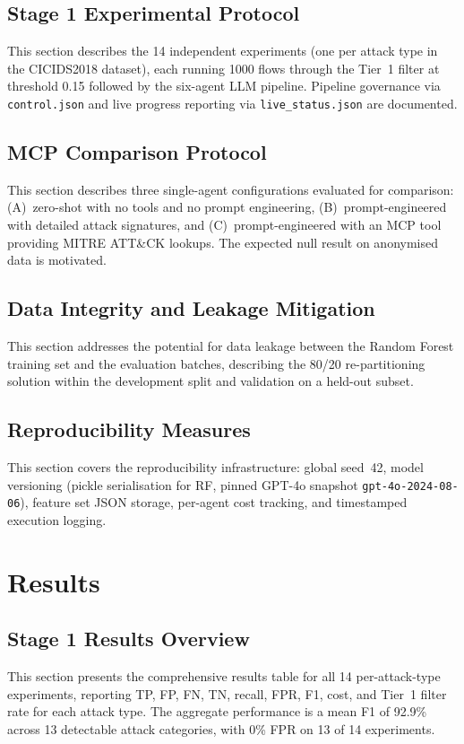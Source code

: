 \documentclass[12pt,openany,oneside,a4paper]{book}
\begin{document}
\section{Stage 1 Experimental Protocol}
\label{sec:stage1-protocol}
This section describes the 14 independent experiments (one per attack type in the CICIDS2018 dataset), each running 1000 flows through the Tier~1 filter at threshold 0.15 followed by the six-agent LLM pipeline. Pipeline governance via \texttt{control.json} and live progress reporting via \texttt{live\_status.json} are documented.

\section{MCP Comparison Protocol}
\label{sec:mcp-comparison-protocol}
This section describes three single-agent configurations evaluated for comparison: (A)~zero-shot with no tools and no prompt engineering, (B)~prompt-engineered with detailed attack signatures, and (C)~prompt-engineered with an MCP tool providing MITRE ATT\&CK lookups. The expected null result on anonymised data is motivated.

\section{Data Integrity and Leakage Mitigation}
\label{sec:data-integrity}
This section addresses the potential for data leakage between the Random Forest training set and the evaluation batches, describing the 80/20 re-partitioning solution within the development split and validation on a held-out subset.

\section{Reproducibility Measures}
\label{sec:reproducibility}
This section covers the reproducibility infrastructure: global seed~42, model versioning (pickle serialisation for RF, pinned GPT-4o snapshot \texttt{gpt-4o-2024-08-06}), feature set JSON storage, per-agent cost tracking, and timestamped execution logging.


\chapter{Results}
\label{ch:results}

\section{Stage 1 Results Overview}
\label{sec:results-overview}
This section presents the comprehensive results table for all 14 per-attack-type experiments, reporting TP, FP, FN, TN, recall, FPR, F1, cost, and Tier~1 filter rate for each attack type. The aggregate performance is a mean F1 of 92.9\% across 13 detectable attack categories, with 0\% FPR on 13 of 14 experiments.
\end{document}
